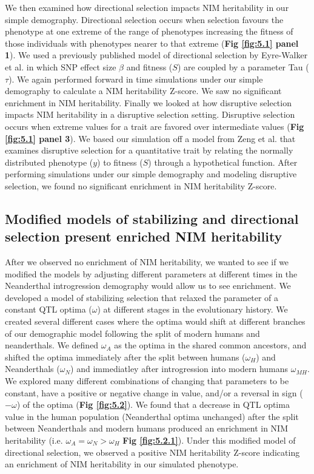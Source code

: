 We then examined how directional selection impacts NIM heritability in our simple demography. Directional selection occurs when selection favours the phenotype at one extreme of the range of phenotypes increasing the fitness of those individuals with phenotypes nearer to that extreme (\textbf{Fig \ref{fig:5.1} panel 1}). We used a previously published model of directional selection by Eyre-Walker et al. \cite{eyre2010genetic} in which SNP effect size $\beta$ and fitness ($S$) are coupled by a parameter Tau ($\tau$). We again performed forward in time simulations under our simple demography to calculate a NIM heritability Z-score. We saw no significant enrichment in NIM heritability.
Finally we looked at how disruptive selection impacts NIM heritability in a disruptive selection setting. Disruptive selection occurs when extreme values for a trait are favored over intermediate values (\textbf{Fig \ref{fig:5.1} panel 3}). We based our simulation off a model from Zeng et al. that examines disruptive selection for a quantitative trait by relating the normally distributed phenotype ($y$) to fitness ($S$) through a hypothetical function. After performing simulations under our simple demography and modeling disruptive selection, we found no significant enrichment in NIM heritability Z-score. 
\subsection{Modified models of stabilizing and directional selection present enriched NIM heritability}
After we observed no enrichment of NIM heritability, we wanted to see if we modified the models by adjusting different parameters at different times in the Neanderthal introgression demography would allow us to see enrichment. We developed a model of stabilizing selection that relaxed the parameter of a constant QTL optima ($\omega$) at different stages in the evolutionary history. We created several different cases where the optima would shift at different branches of our demographic model following the split of modern humans and neanderthals. We defined $\omega_A$ as the optima in the shared common ancestors, and shifted the optima immediately after the split between humans ($\omega_H$) and Neanderthals ($\omega_{N}$) and immediatley after introgression into modern humans $\omega_{MH}$. We explored many different combinations of changing that parameters to be constant, have a positive or negative change in value, and/or a reversal in sign ($-\omega$) of the optima (\textbf{Fig \ref{fig:5.2}}). We found that a decrease in QTL optima value in the human population (Neanderthal optima unchanged) after the split between Neanderthals and modern humans produced an enrichment in NIM heritability (i.e. $\omega_A = \omega_N > \omega_H$ \textbf{Fig \ref{fig:5.2.1}}). Under this modified model of directional selection, we observed a positive NIM heritability Z-score indicating an enrichment of NIM heritability in our simulated phenotype.


